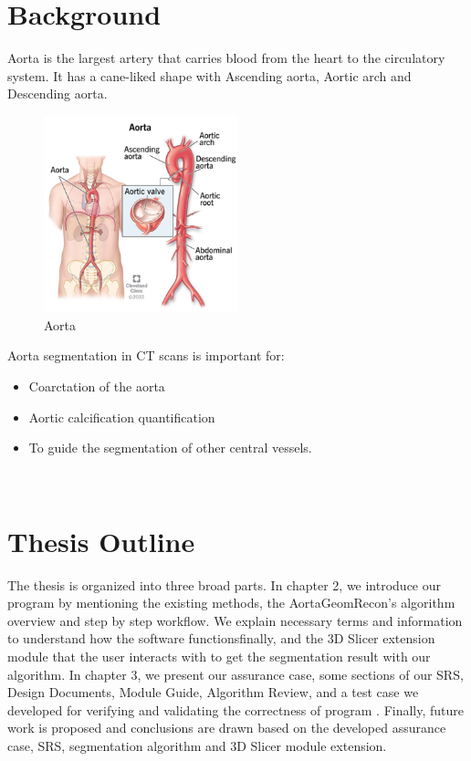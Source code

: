\section{Background} \label{bg}
Aorta is the largest artery that carries blood from the heart to the circulatory system. It has a cane-liked shape with Ascending aorta, Aortic arch and Descending aorta. 

\begin{figure}[H]
    \centering
    \includegraphics[width=0.5\textwidth]{figures/Sample/Aorta.png}
    \caption[Aorta]{Aorta}
    \label{fig_aorta}
\end{figure}

Aorta segmentation in CT scans is important for:
\begin{itemize}
\item Coarctation of the aorta
\item Aortic calcification quantification
\item To guide the segmentation of other central vessels. 
\end{itemize} ~\\

\section{Thesis Outline} \label{TO}

The thesis is organized into three broad parts. In chapter 2, we introduce our program \progname{} by mentioning the existing methods, the AortaGeomRecon's algorithm overview and step by step  workflow. We explain necessary terms and information to understand how the software functionsfinally, and the 3D Slicer extension module that the user interacts with to get the segmentation result with our algorithm. In chapter 3, we present our assurance case, some sections of our SRS, Design Documents, Module Guide, Algorithm Review, and a test case we developed for verifying and validating the correctness of program \progname{}. Finally, future work is proposed and conclusions are drawn based on the developed assurance case, SRS, segmentation algorithm and 3D Slicer module extension.